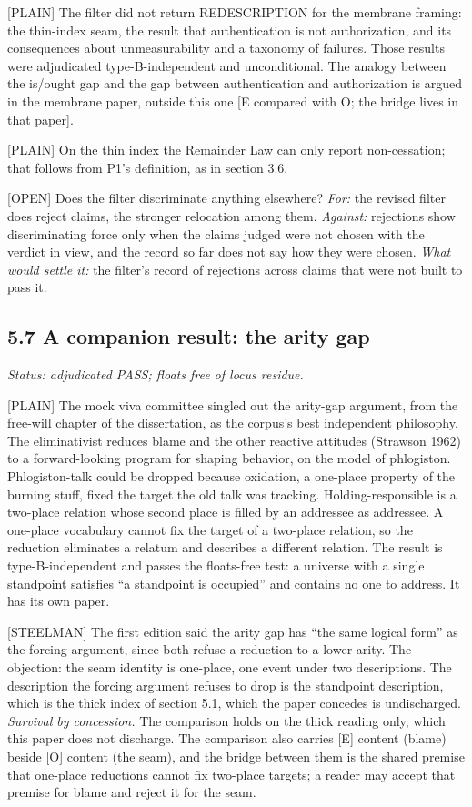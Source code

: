 \documentclass[11pt]{article}
\newcommand{\register}[1]{{\ttfamily\small #1}}
\begin{document}
\register{[PLAIN]} The filter did not return REDESCRIPTION for the membrane framing: the thin-index seam, the result that authentication is not authorization, and its consequences about unmeasurability and a taxonomy of failures. Those results were adjudicated type-B-independent and unconditional. The analogy between the is/\allowbreak{}ought gap and the gap between authentication and authorization is argued in the membrane paper, outside this one [E compared with O; the bridge lives in that paper].

\register{[PLAIN]} On the thin index the Remainder Law can only report non-cessation; that follows from P1's definition, as in section 3.6.

\register{[OPEN]} Does the filter discriminate anything elsewhere? \emph{For:} the revised filter does reject claims, the stronger relocation among them. \emph{Against:} rejections show discriminating force only when the claims judged were not chosen with the verdict in view, and the record so far does not say how they were chosen. \emph{What would settle it:} the filter's record of rejections across claims that were not built to pass it.

\subsection*{5.7 A companion result: the arity gap}

\emph{Status: adjudicated PASS; floats free of locus residue.}

\register{[PLAIN]} The mock viva committee singled out the arity-gap argument, from the free-will chapter of the dissertation, as the corpus's best independent philosophy. The eliminativist reduces blame and the other reactive attitudes (Strawson 1962) to a forward-looking program for shaping behavior, on the model of phlogiston. Phlogiston-talk could be dropped because oxidation, a one-place property of the burning stuff, fixed the target the old talk was tracking. Holding-responsible is a two-place relation whose second place is filled by an addressee as addressee. A one-place vocabulary cannot fix the target of a two-place relation, so the reduction eliminates a relatum and describes a different relation. The result is type-B-independent and passes the floats-free test: a universe with a single standpoint satisfies ``a standpoint is occupied'' and contains no one to address. It has its own paper.

\register{[STEELMAN]} The first edition said the arity gap has ``the same logical form'' as the forcing argument, since both refuse a reduction to a lower arity. The objection: the seam identity is one-place, one event under two descriptions. The description the forcing argument refuses to drop is the standpoint description, which is the thick index of section 5.1, which the paper concedes is undischarged. \emph{Survival by concession.} The comparison holds on the thick reading only, which this paper does not discharge. The comparison also carries [E] content (blame) beside [O] content (the seam), and the bridge between them is the shared premise that one-place reductions cannot fix two-place targets; a reader may accept that premise for blame and reject it for the seam.
\end{document}
